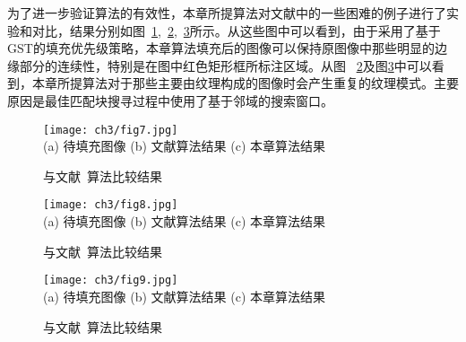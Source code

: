 为了进一步验证算法的有效性，本章所提算法对文献中的一些困难的例子进行了实验和对比，结果分别如图~\ref{ch3:fig:7},~\ref{ch3:fig:8},~\ref{ch3:fig:9}所示。从这些图中可以看到，由于采用了基于GST的填充优先级策略，本章算法填充后的图像可以保持原图像中那些明显的边缘部分的连续性，特别是在图中红色矩形框所标注区域。从图 ~\ref{ch3:fig:8}及图\ref{ch3:fig:9}中可以看到，本章所提算法对于那些主要由纹理构成的图像时会产生重复的纹理模式。主要原因是最佳匹配块搜寻过程中使用了基于邻域的搜索窗口。\par
\begin{figure}[!htbp]
\begin{center}
  \texttt{[image: ch3/fig7.jpg]}\\
  (a) 待填充图像 (b) 文献算法结果    (c) 本章算法结果
\end{center}
\caption{与文献~算法比较结果}
\label{ch3:fig:7}       %
\end{figure}
\begin{figure}[!htbp]
\begin{center}
  \texttt{[image: ch3/fig8.jpg]}
  \\
  (a) 待填充图像 (b) 文献算法结果    (c) 本章算法结果
\end{center}
\caption{与文献~算法比较结果}
\label{ch3:fig:8}       %
\end{figure}

\begin{figure}[!htbp]
\begin{center}
  \texttt{[image: ch3/fig9.jpg]}
  \\
  (a) 待填充图像 (b) 文献算法结果    (c) 本章算法结果
\end{center}
\caption{与文献~算法比较结果}
\label{ch3:fig:9}       %
\end{figure}

